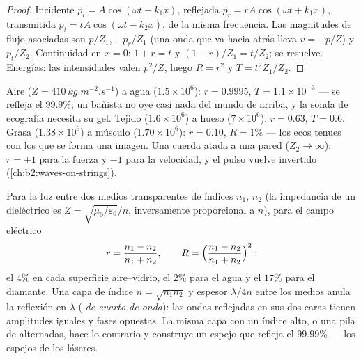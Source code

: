 \begin{proof}
Incidente $p_i = A\cos(\omega t - k_1x)$, reflejada $p_r = rA\cos(\omega t + k_1x)$,
transmitida $p_t = tA\cos(\omega t - k_2x)$, de la misma frecuencia. Las magnitudes
de flujo asociadas son $p/Z_1$, $-p_r/Z_1$ (una onda que va hacia atrás lleva
$v = -p/Z$) y $p_t/Z_2$. Continuidad en $x = 0$: $1 + r = t$ y $(1 - r)/Z_1
= t/Z_2$; se resuelve. Energías: las intensidades valen $p^2/Z$, luego $R = r^2$ y
$T = t^2Z_1/Z_2$.
\end{proof}

\begin{example}\label{ex:b2:wave-interfaces:sound}
Aire ($Z = \qty{410}{kg.m^{-2}.s^{-1}}$) a agua ($1.5 \times 10^6$): $r = 0.9995$,
$T = 1.1 \times 10^{-3}$ --- se refleja el $99.9\%$; un bañista no oye casi nada
del mundo de arriba, y la sonda de ecografía necesita su gel. Tejido
($1.6 \times 10^6$) a hueso ($7 \times 10^6$): $r = 0.63$, $T = 0.6$. Grasa ($1.38 \times
10^6$) a músculo ($1.70 \times 10^6$): $r = 0.10$, $R = 1\%$ --- los ecos tenues con los que
se forma una imagen. Una cuerda atada a una pared ($Z_2 \to \infty$): $r = +1$ para la
fuerza y $-1$ para la velocidad, y el pulso vuelve invertido
(\cref{ch:b2:waves-on-strings}).
\end{example}

\begin{proposition}\label{prop:b2:wave-interfaces:optics}
Para la luz entre dos medios transparentes de índices $n_1$, $n_2$ (la
impedancia de un dieléctrico es $Z = \sqrt{\mu_0/\varepsilon_0}/n$, inversamente
proporcional a $n$), para el campo eléctrico
\[
r = \frac{n_1 - n_2}{n_1 + n_2} , \qquad R = \Bigl(\frac{n_1 - n_2}{n_1 + n_2}\Bigr)^2 :
\]
el $4\%$ en cada superficie aire--vidrio, el $2\%$ para el agua y el $17\%$ para el diamante. Una
capa de índice $n = \sqrt{n_1n_2}$ y espesor $\lambda/4n$ entre los medios
anula la reflexión en $\lambda$ (\emph{ de cuarto de
onda}): las ondas reflejadas en sus dos caras tienen amplitudes iguales
y fases opuestas. La misma capa con un índice alto, o una pila de
 alternadas, hace lo contrario y construye un
espejo que refleja el $99.99\%$ --- los espejos de los láseres.
\end{proposition}

